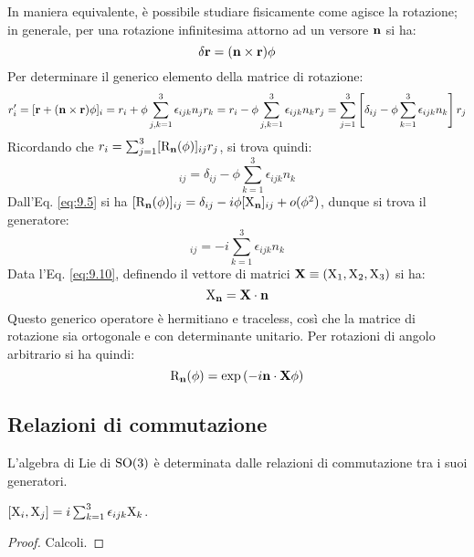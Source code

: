 In maniera equivalente, è possibile studiare fisicamente come agisce la rotazione; in generale, per una rotazione infinitesima attorno ad un versore $ \mathbf{n} $ si ha:
\begin{equation}
	\delta \mathbf{r} = (\mathbf{n} \times \mathbf{r}) \phi
	\label{eq:9.11}
\end{equation}
Per determinare il generico elemento della matrice di rotazione:
\begin{equation*}
	r'_i = [\mathbf{r} + (\mathbf{n} \times \mathbf{r}) \phi]_i = r_i + \phi \sum_{j,k = 1}^{3} \epsilon_{ijk} n_j r_k = r_i - \phi \sum_{j,k = 1}^{3} \epsilon_{ijk} n_k r_j = \sum_{j = 1}^{3} \left[ \delta_{ij} - \phi \sum_{k = 1}^{3} \epsilon_{ijk} n_k \right] r_j
\end{equation*}
Ricordando che $ r_i = \sum_{j = 1}^{3} [\mathrm{R}_{\mathbf{n}}(\phi)]_{ij} r_j $, si trova quindi:
\begin{equation}
	[\tens{R}_{\ve{n}}(\phi)]_{ij} = \delta_{ij} - \phi \sum_{k = 1}^{3} \epsilon_{ijk} n_k
	\label{eq:9.12}
\end{equation}
Dall'Eq. \ref{eq:9.5} si ha $ [\mathrm{R}_{\mathbf{n}}(\phi)]_{ij} = \delta_{ij} - i \phi [\mathrm{X}_{\mathbf{n}}]_{ij} + o(\phi^2) $, dunque si trova il generatore:
\begin{equation}
	[\tens{X}_{\ve{n}}]_{ij} = -i \sum_{k = 1}^{3} \epsilon_{ijk} n_k
	\label{eq:9.13}
\end{equation}
Data l'Eq. \ref{eq:9.10}, definendo il vettore di matrici $ \mathbf{X} \equiv (\mathrm{X}_1, \mathrm{X}_2, \mathrm{X}_3) $ si ha:
\begin{equation}
	\mathrm{X}_{\mathbf{n}} = \mathbf{X} \cdot \mathbf{n}
	\label{eq:9.14}
\end{equation}
Questo generico operatore è hermitiano e traceless, così che la matrice di rotazione sia ortogonale e con determinante unitario. Per rotazioni di angolo arbitrario si ha quindi:
\begin{equation}
	\mathrm{R}_{\mathbf{n}}(\phi) = \exp \left( -i \mathbf{n} \cdot \mathbf{X} \phi \right)
	\label{eq:9.15}
\end{equation}

\subsection{Relazioni di commutazione}

L'algebra di Lie di $ \mathrm{SO}(3) $ è  determinata dalle relazioni di commutazione tra i suoi generatori.

\begin{proposition}\label{so3-comm}
	$ [\mathrm{X}_i, \mathrm{X}_j] = i \sum_{k = 1}^{3} \epsilon_{ijk} \mathrm{X}_k $.
\end{proposition}
\begin{proof}
	Calcoli.
\end{proof}

